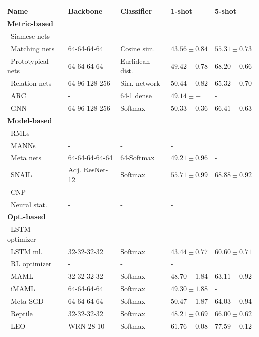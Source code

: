 \begin{table}[phtb]
    \begin{tabularx}{\linewidth}{lllll}
        \toprule 
         Name & Backbone & Classifier & 1-shot & 5-shot \\
         \midrule 
         \textbf{Metric-based} \\
         \, Siamese nets & - & - & -   \\
         \, Matching nets & 64-64-64-64 & Cosine sim. & $43.56 \pm 0.84$ & $55.31 \pm 0.73$     \\
         \, Prototypical nets &  64-64-64-64 & Euclidean dist. & $49.42 \pm 0.78$ & $68.20 \pm 0.66$  \\
         \, Relation nets &64-96-128-256 &  Sim. network & $50.44 \pm 0.82$ & $65.32 \pm 0.70$ \\
         \, ARC & - & 64-1 dense & $49.14 \pm -$ & - \\
         \, GNN  & 64-96-128-256 & Softmax & $50.33 \pm 0.36$& $66.41 \pm 0.63$ \\
         \midrule
         \textbf{Model-based}  \\
         \, RMLs  & - & - & - \\
         \, MANNs & - & - & - \\
         \, Meta nets & 64-64-64-64-64 & 64-Softmax & $49.21 \pm 0.96$ & - \\
         \, SNAIL  & Adj. ResNet-12 &  Softmax & $55.71 \pm 0.99$ & $68.88 \pm 0.92$ \\
         \, CNP  & - & - & - \\
         \, Neural stat. & - & - & - \\
         \midrule
         \textbf{Opt.-based} &  & &  \\
         \, LSTM optimizer & - & - & -  \\
         \, LSTM ml. & 32-32-32-32 & Softmax & $43.44 \pm 0.77$ & $60.60 \pm 0.71$  \\
         \, RL optimizer  & - & - & -  \\
         \, MAML  & 32-32-32-32 & Softmax & $48.70 \pm 1.84$ & $63.11 \pm 0.92$  \\
         \, iMAML  & 64-64-64-64 & Softmax & $49.30 \pm 1.88$ & - \\
         \, Meta-SGD  & 64-64-64-64 & Softmax & $50.47 \pm 1.87$ & $64.03 \pm 0.94$ \\
         \, Reptile  & 32-32-32-32 & Softmax & $48.21 \pm 0.69$& $66.00 \pm 0.62$  \\
         \, LEO  & WRN-28-10 & Softmax & $61.76 \pm 0.08$ & $77.59 \pm 0.12$  \\

\end{tabularx}
\end{table}
